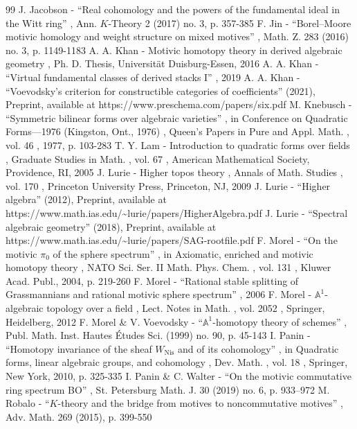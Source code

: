 \documentclass[11pt]{article}
\numberwithin{equation}{section}\renewcommand{\encodingdefault}{TU}
\theoremstyle{remark}
\theoremstyle{definition}
\numberwithin{equation}{thm}
\begin{document}
\begin{thebibliography}{99}
 J. Jacobson - “Real cohomology and the powers of the fundamental ideal in the Witt ring” , Ann. $K$-Theory 2 (2017) no. 3, p. 357-385
 F. Jin - “Borel–Moore motivic homology and weight structure on mixed motives” , Math. Z. 283 (2016) no. 3, p. 1149-1183
 A. A. Khan - Motivic homotopy theory in derived algebraic geometry , Ph. D. Thesis, Universität Duisburg-Essen, 2016
 A. A. Khan - “Virtual fundamental classes of derived stacks I” , 2019
 A. A. Khan - “Voevodsky’s criterion for constructible categories of coefficients” (2021), Preprint, available at https://www.preschema.com/papers/six.pdf
 M. Knebusch - “Symmetric bilinear forms over algebraic varieties” , in Conference on Quadratic Forms—1976 (Kingston, Ont., 1976) , Queen’s Papers in Pure and Appl. Math. , vol. 46 , 1977, p. 103-283
 T. Y. Lam - Introduction to quadratic forms over fields , Graduate Studies in Math. , vol. 67 , American Mathematical Society, Providence, RI, 2005
 J. Lurie - Higher topos theory , Annals of Math. Studies , vol. 170 , Princeton University Press, Princeton, NJ, 2009
 J. Lurie - “Higher algebra” (2012), Preprint, available at https://www.math.ias.edu/\textasciitilde{}lurie/papers/HigherAlgebra.pdf
 J. Lurie - “Spectral algebraic geometry” (2018), Preprint, available at https://www.math.ias.edu/\textasciitilde{}lurie/papers/SAG-rootfile.pdf
 F. Morel - “On the motivic $\pi _0$ of the sphere spectrum” , in Axiomatic, enriched and motivic homotopy theory , NATO Sci. Ser. II Math. Phys. Chem. , vol. 131 , Kluwer Acad. Publ., 2004, p. 219-260
 F. Morel - “Rational stable splitting of Grassmannians and rational motivic sphere spectrum” , 2006
 F. Morel - $\mathbb{A}^1$-algebraic topology over a field , Lect. Notes in Math. , vol. 2052 , Springer, Heidelberg, 2012
 F. Morel \& V. Voevodsky - “${\mathbb{A}}^1$-homotopy theory of schemes” , Publ. Math. Inst. Hautes Études Sci. (1999) no. 90, p. 45-143
 I. Panin - “Homotopy invariance of the sheaf $W_{\mathrm{Nis}}$ and of its cohomology” , in Quadratic forms, linear algebraic groups, and cohomology , Dev. Math. , vol. 18 , Springer, New York, 2010, p. 325-335
 I. Panin \& C. Walter - “On the motivic commutative ring spectrum BO” , St. Petersburg Math. J. 30 (2019) no. 6, p. 933–972
 M. Robalo - “$K$-theory and the bridge from motives to noncommutative motives” , Adv. Math. 269 (2015), p. 399-550

\end{thebibliography}
\end{document}
